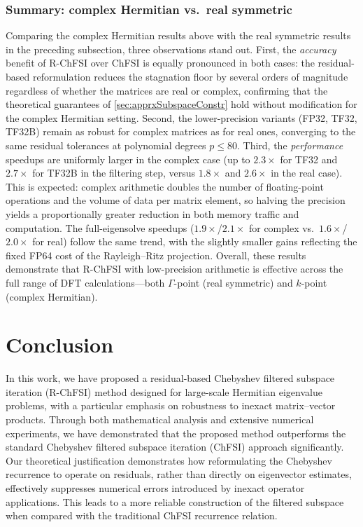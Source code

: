 \documentclass[preprint,3p,number,sort&compress]{elsarticle}
\newcommand{\cblue }{\color{black}}
\newcommand{\cn}{\color{black}}
\begin{document}
{\cblue \subsubsection{Summary: complex Hermitian vs.\ real symmetric}
Comparing the complex Hermitian results above with the real symmetric results in the preceding subsection, three observations stand out. First, the \emph{accuracy} benefit of R-ChFSI over ChFSI is equally pronounced in both cases: the residual-based reformulation reduces the stagnation floor by several orders of magnitude regardless of whether the matrices are real or complex, confirming that the theoretical guarantees of \cref{sec:apprxSubspaceConstr} hold without modification for the complex Hermitian setting. Second, the lower-precision variants (FP32, TF32, TF32B) remain as robust for complex matrices as for real ones, converging to the same residual tolerances at polynomial degrees $p\leq80$. Third, the \emph{performance} speedups are uniformly larger in the complex case (up to $2.3{\times}$ for TF32 and $2.7{\times}$ for TF32B in the filtering step, versus $1.8{\times}$ and $2.6{\times}$ in the real case). This is expected: complex arithmetic doubles the number of floating-point operations and the volume of data per matrix element, so halving the precision yields a proportionally greater reduction in both memory traffic and computation. The full-eigensolve speedups ($1.9{\times}$/$2.1{\times}$ for complex vs.\ $1.6{\times}$/$2.0{\times}$ for real) follow the same trend, with the slightly smaller gains reflecting the fixed FP64 cost of the Rayleigh--Ritz projection. Overall, these results demonstrate that R-ChFSI with low-precision arithmetic is effective across the full range of DFT calculations---both $\Gamma$-point (real symmetric) and $k$-point (complex Hermitian).\cn}

\section{Conclusion}
In this work, we have proposed a residual-based Chebyshev filtered subspace iteration (R-ChFSI) method designed for large-scale Hermitian eigenvalue problems, with a particular emphasis on robustness to inexact matrix–vector products. Through both mathematical analysis and extensive numerical experiments, we have demonstrated that the proposed method outperforms the standard Chebyshev filtered subspace iteration (ChFSI) approach significantly. Our theoretical justification demonstrates how reformulating the Chebyshev recurrence to operate on residuals, rather than directly on eigenvector estimates, effectively suppresses numerical errors introduced by inexact operator applications. This leads to a more reliable construction of the filtered subspace when compared with the traditional ChFSI recurrence relation.
\end{document}
